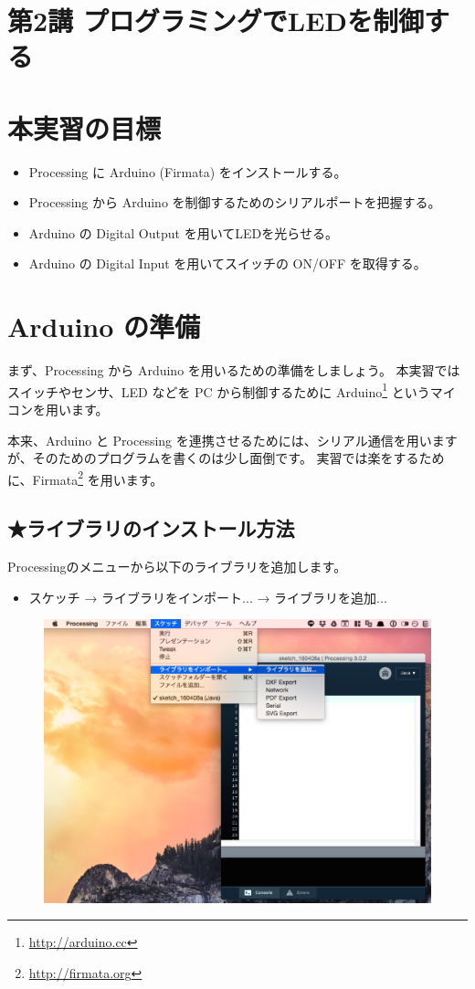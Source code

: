 \documentclass[11pt,a4paper]{jarticle}
\begin{document}
\section*{\LARGE{第2講 プログラミングでLEDを制御する}}
\section{本実習の目標}
\begin{itemize}
\item Processing に Arduino (Firmata) をインストールする。
\item Processing から Arduino を制御するためのシリアルポートを把握する。
\item Arduino の Digital Output を用いてLEDを光らせる。
\item Arduino の Digital Input を用いてスイッチの ON/OFF を取得する。
\end{itemize}



\section{Arduino の準備}
まず、Processing から Arduino を用いるための準備をしましょう。
本実習ではスイッチやセンサ、LED などを PC から制御するために Arduino\footnote{\url{http://arduino.cc}} というマイコンを用います。

本来、Arduino と Processing を連携させるためには、シリアル通信を用いますが、そのためのプログラムを書くのは少し面倒です。
実習では楽をするために、Firmata\footnote{\url{http://firmata.org}} を用います。

\subsection*{★ライブラリのインストール方法}

Processingのメニューから以下のライブラリを追加します。
\begin{itemize}
\item スケッチ → ライブラリをインポート... → ライブラリを追加...
\end{itemize}

\begin{figure}[htbp]
  \centering
  \includegraphics[width=0.75\columnwidth]{img/eps/how_to_install_the_Firmata_library1.eps}
  \label{figure:LED}
\end{figure}
\end{document}
